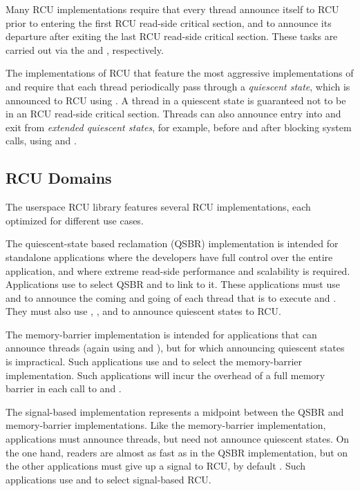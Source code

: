 \documentclass[letterpaper,twocolumn,10pt]{article}
\begin{document}
Many RCU implementations require that every thread announce itself to
RCU prior to entering the first RCU read-side critical section, and
to announce its departure after exiting the last RCU read-side
critical section.
These tasks are carried out via the  and
, respectively.

The implementations of RCU that feature the most aggressive implementations of
 and  require that each thread
periodically pass through a \emph{quiescent state}, which is announced to RCU
using .
A thread in a quiescent state is guaranteed not to be in an RCU
read-side critical section.
Threads can also announce entry into and exit from \emph{extended
quiescent states}, for example, before and after blocking system
calls, using  and .

\subsection{RCU Domains}
\label{sec:RCU Domains}

The userspace RCU library features several RCU implementations, each
optimized for different use cases.

The quiescent-state based reclamation (QSBR) implementation is intended
for standalone applications where the developers have full control
over the entire application, and where extreme read-side performance
and scalability is required.
Applications use  to select QSBR and
 to link to it.
These applications must use  and
 to announce the coming and going
of each thread that is to execute  and
.
They must also use , ,
and  to announce quiescent states to RCU.

The memory-barrier implementation is intended for applications that
can announce threads (again using  and
), but for which announcing quiescent states is
impractical.
Such applications use  and
 to select the memory-barrier implementation.
Such applications will incur the overhead of a full memory barrier in
each call to  and .

The signal-based implementation represents a midpoint between the QSBR
and memory-barrier implementations.
Like the memory-barrier implementation, applications must announce
threads, but need not announce quiescent states.
On the one hand, readers are almost as fast as in the QSBR implementation,
but on the other applications must give up a signal to RCU, by default
.
Such applications use  and
 to select signal-based RCU.
\end{document}

